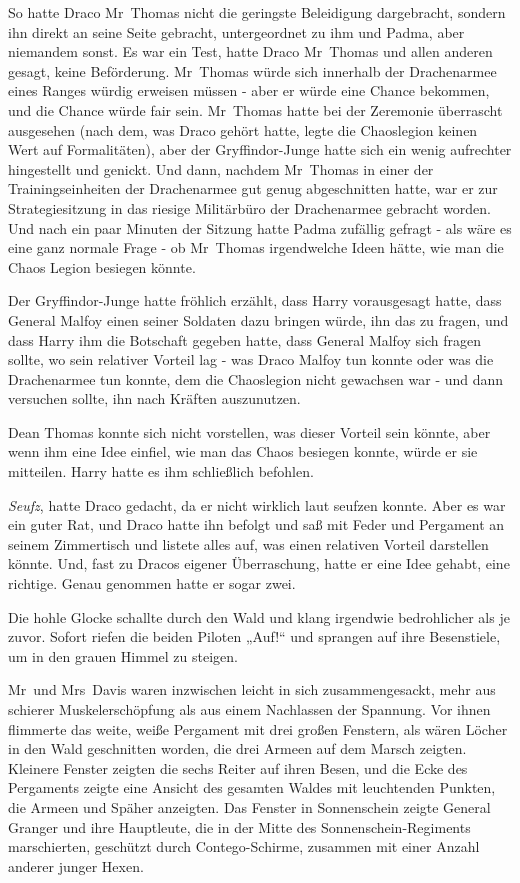 {So hatte Draco Mr~Thomas nicht die geringste Beleidigung dargebracht, sondern ihn direkt an seine Seite gebracht, untergeordnet zu ihm und Padma, aber niemandem sonst. Es war ein Test, hatte Draco Mr~Thomas und allen anderen gesagt, keine Beförderung. Mr~Thomas würde sich innerhalb der Drachenarmee eines Ranges würdig erweisen müssen - aber er würde eine Chance bekommen, und die Chance würde fair sein. Mr~Thomas hatte bei der Zeremonie überrascht ausgesehen (nach dem, was Draco gehört hatte, legte die Chaoslegion keinen Wert auf Formalitäten), aber der Gryffindor-Junge hatte sich ein wenig aufrechter hingestellt und genickt. Und dann, nachdem Mr~Thomas in einer der Trainingseinheiten der Drachenarmee gut genug abgeschnitten hatte, war er zur Strategiesitzung in das riesige Militärbüro der Drachenarmee gebracht worden. Und nach ein paar Minuten der Sitzung hatte Padma zufällig gefragt - als wäre es eine ganz normale Frage - ob Mr~Thomas irgendwelche Ideen hätte, wie man die Chaos Legion besiegen könnte.

Der Gryffindor-Junge hatte fröhlich erzählt, dass Harry vorausgesagt hatte, dass General Malfoy einen seiner Soldaten dazu bringen würde, ihn das zu fragen, und dass Harry ihm die Botschaft gegeben hatte, dass General Malfoy sich fragen sollte, wo sein relativer Vorteil lag - was Draco Malfoy tun konnte oder was die Drachenarmee tun konnte, dem die Chaoslegion nicht gewachsen war - und dann versuchen sollte, ihn nach Kräften auszunutzen.

Dean Thomas konnte sich nicht vorstellen, was dieser Vorteil sein könnte, aber wenn ihm eine Idee einfiel, wie man das Chaos besiegen konnte, würde er sie mitteilen. Harry hatte es ihm schließlich befohlen.

\emph{Seufz}, hatte Draco gedacht, da er nicht wirklich laut seufzen konnte. Aber es war ein guter Rat, und Draco hatte ihn befolgt und saß mit Feder und Pergament an seinem Zimmertisch und listete alles auf, was einen relativen Vorteil darstellen könnte. Und, fast zu Dracos eigener Überraschung, hatte er eine Idee gehabt, eine richtige. Genau genommen hatte er sogar zwei.

Die hohle Glocke schallte durch den Wald und klang irgendwie bedrohlicher als je zuvor. Sofort riefen die beiden Piloten „Auf!“ und sprangen auf ihre Besenstiele, um in den grauen Himmel zu steigen.

Mr~und Mrs~Davis waren inzwischen leicht in sich zusammengesackt, mehr aus schierer Muskelerschöpfung als aus einem Nachlassen der Spannung. Vor ihnen flimmerte das weite, weiße Pergament mit drei großen Fenstern, als wären Löcher in den Wald geschnitten worden, die drei Armeen auf dem Marsch zeigten. Kleinere Fenster zeigten die sechs Reiter auf ihren Besen, und die Ecke des Pergaments zeigte eine Ansicht des gesamten Waldes mit leuchtenden Punkten, die Armeen und Späher anzeigten. Das Fenster in Sonnenschein zeigte General Granger und ihre Hauptleute, die in der Mitte des Sonnenschein-Regiments marschierten, geschützt durch Contego-Schirme, zusammen mit einer Anzahl anderer junger Hexen.

}
